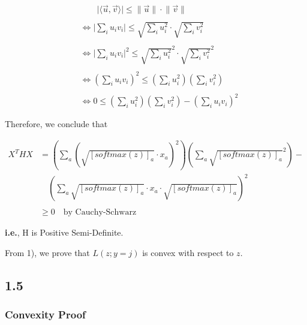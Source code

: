 \documentclass[10pt]{article}
\newcommand{\softmax}[1]{ [softmax(z)]_{#1} }
\begin{document}
\begin{equation}
\begin{aligned}
  {} & \qquad \lvert \langle \vec{u},\vec{v} \rangle \rvert \leq \lVert \vec{u} \rVert \cdot \lVert \vec{v} \rVert
  \\ \\ &
  \Leftrightarrow \bigg\lvert \sum_i u_i v_i \bigg\rvert \leq \sqrt{\sum_i u_i^2} \cdot \sqrt{\sum_i v_i^2}
  \\ \\ &
  \Leftrightarrow \bigg\lvert
				\sum_i u_i v_i \bigg\rvert^2 \leq
			\sqrt{\sum_i u_i^2}^2 \cdot
				\sqrt{\sum_i v_i^2}^2
  \\ \\ &
  \Leftrightarrow \left(
				\sum_i u_i v_i \right)^2 \leq
			\left( \sum_i u_i^2 \right)
				\left( \sum_i v_i^2 \right)
  \\ \\ &
  \Leftrightarrow 0 \leq
			\left( \sum_i u_i^2 \right)
				\left( \sum_i v_i^2 \right) - \left(
				\sum_i u_i v_i \right)^2
\end{aligned}
\end{equation}

Therefore, we conclude that

\begin{equation}
\begin{aligned}
  X^{T}HX {} & = \left(\sum_{a}\left(\sqrt{\softmax{a}}\cdot x_{a}\right)^2\right)
					\left(\sum_{a}\sqrt{\softmax{a}}^2\right) - \\
					&\quad \left( \sum_{a}
						\sqrt{\softmax{a}}\cdot x_{a}\cdot
						\sqrt{\softmax{a}}\right)^2
  \\ \\ &
  \geq 0 \quad \text{by Cauchy-Schwarz}
\end{aligned}
\end{equation}

\textbf{i.e.}, H is Positive Semi-Definite.

From 1), we prove that $L(z;y=j)$ is convex with respect to $z$.


\subsection{1.5}

\subsubsection{Convexity Proof}
\end{document}

